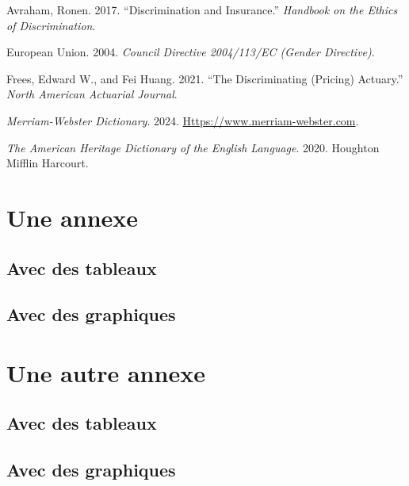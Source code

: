 \documentclass[
  a4paper,
  11pt,
  a4paper,
  twoside,
  openright]{report}
\newlength{\cslhangindent}
\newenvironment{CSLReferences}[2] %
 {\begin{list}{}{%
  \setlength{\itemindent}{0pt}
  \setlength{\leftmargin}{0pt}
  \setlength{\parsep}{0pt}
  \ifodd #1
   \setlength{\leftmargin}{\cslhangindent}
   \setlength{\itemindent}{-1\cslhangindent}
  \fi
  \setlength{\itemsep}{#2\baselineskip}}}
 {\end{list}}
\begin{document}

\protect{}\label{refs}
\begin{CSLReferences}{1}{1}
Avraham, Ronen. 2017. {``Discrimination and Insurance.''} \emph{Handbook
on the Ethics of Discrimination}.

European Union. 2004. \emph{Council Directive 2004/113/EC (Gender
Directive)}.

Frees, Edward W., and Fei Huang. 2021. {``The Discriminating (Pricing)
Actuary.''} \emph{North American Actuarial Journal}.

\emph{Merriam-Webster Dictionary}. 2024.
\href{https://www.merriam-webster.com}{Https://www.merriam-webster.com}.

\emph{The American Heritage Dictionary of the English Language}. 2020.
Houghton Mifflin Harcourt.

\end{CSLReferences}

\cleardoublepage
{}
{}
\appendix

\chapter{Une annexe}\label{une-annexe}

\section{Avec des tableaux}\label{avec-des-tableaux}

\section{Avec des graphiques}\label{avec-des-graphiques}

\chapter{Une autre annexe}\label{une-autre-annexe}

\section{Avec des tableaux}\label{avec-des-tableaux-1}

\section{Avec des graphiques}\label{avec-des-graphiques-1}
\end{document}
